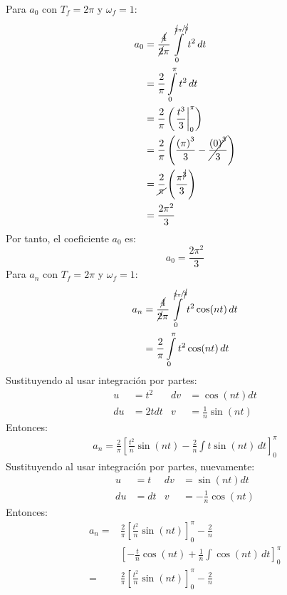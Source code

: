 \begin{multicols}{2}
Para $a_0$ con $T_f = 2 \pi$ y $\omega_f = 1$:
\begin{align*}
    a_0 &= \frac{\cancel{4}}{\cancel{2} \pi} \int\limits_{0}^{\sfrac{\cancel{2} \pi}{\cancel{2}}} t^{2} \,dt\\
    &= \frac{2}{\pi} \int\limits_{0}^{\pi} t^{2} \,dt\\
    &= \frac{2}{\pi} \left(\left.\frac{t^{3}}{3} \right|_{0}^{\pi}\right)\\
    &= \frac{2}{\pi} \left(\frac{\left(\pi\right)^{3}}{3} - \cancel{\frac{\left(0\right)^{3}}{3}}\right)\\
    &= \frac{2}{\cancel{\pi}} \left(\frac{\pi^{\cancel{3}}}{3}\right)\\
    &= \frac{2\pi^{2}}{3}
\end{align*}
Por tanto, el coeficiente $a_0$ es:
\begin{equation}
    a_0 = \frac{2\pi^{2}}{3} \label{pro2:res1}
\end{equation}
Para $a_n$ con $T_f = 2 \pi$ y $\omega_f = 1$:
\begin{align*}
    a_n &= \frac{\cancel{4}}{\cancel{2} \pi} \int\limits_{0}^{\sfrac{\cancel{2} \pi}{\cancel{2}}} t^{2} \cos(nt) \,dt\\
    &= \frac{2}{\pi} \int\limits_{0}^{\pi} t^{2} \cos(nt) \,dt\\
\end{align*}
Sustituyendo al usar integración por partes:
\begin{align*}
    u&=t^{2}           &  dv&=\cos\left(nt\right) dt\\
    du&=2tdt         &  v&=\frac{1}{n} \sin\left(nt\right)
\end{align*}
Entonces:
\begin{align*}
    a_n = \frac{2}{\pi} \left[\frac{t^{2}}{n}\sin(nt) - \frac{2}{n} \int t \sin(nt) \,dt \right]_{0}^{\pi}
\end{align*}
Sustituyendo al usar integración por partes, nuevamente:
\begin{align*}
    u&=t          &  dv&=\sin\left(nt\right) dt\\
    du&=dt         &  v&=-\frac{1}{n} \cos\left(nt\right)
\end{align*}
Entonces:
\begin{align*}
    a_n =& \frac{2}{\pi} \left[\frac{t^{2}}{n}\sin(nt)\right]_{0}^{\pi} - \frac{2}{n}\\
    &\left[-\frac{t}{n}\cos(nt) + \frac{1}{n} \int \cos(nt) \,dt \right]_{0}^{\pi}\\
    =& \frac{2}{\pi} \left[\frac{t^{2}}{n}\sin(nt)\right]_{0}^{\pi} - \frac{2}{n}\\ 

\end{align*}
\end{multicols}
